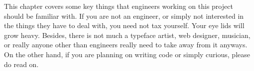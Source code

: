 

This chapter covers some key things that engineers working on this project should be familiar with. If you are not an engineer, or simply not interested in the things they have to deal with, you need not tax yourself. Your eye lids will grow heavy. Besides, there is not much a typeface artist, web designer, musician, or really anyone other than engineers really need to take away from it anyways. On the other hand, if you are planning on writing code or simply curious, please do read on.



%


\StopChapter


